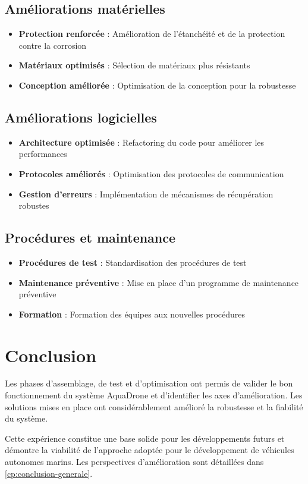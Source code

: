 {\subsection{Améliorations matérielles}
\begin{itemize}
    \item \textbf{Protection renforcée} : Amélioration de l'étanchéité et de la protection contre la corrosion
    \item \textbf{Matériaux optimisés} : Sélection de matériaux plus résistants
    \item \textbf{Conception améliorée} : Optimisation de la conception pour la robustesse
\end{itemize}

\subsection{Améliorations logicielles}
\begin{itemize}
    \item \textbf{Architecture optimisée} : Refactoring du code pour améliorer les performances
    \item \textbf{Protocoles améliorés} : Optimisation des protocoles de communication
    \item \textbf{Gestion d'erreurs} : Implémentation de mécanismes de récupération robustes
\end{itemize}

\subsection{Procédures et maintenance}
\begin{itemize}
    \item \textbf{Procédures de test} : Standardisation des procédures de test
    \item \textbf{Maintenance préventive} : Mise en place d'un programme de maintenance préventive
    \item \textbf{Formation} : Formation des équipes aux nouvelles procédures
\end{itemize}

\section{Conclusion}
Les phases d'assemblage, de test et d'optimisation ont permis de valider le bon fonctionnement du système AquaDrone et d'identifier les axes d'amélioration. Les solutions mises en place ont considérablement amélioré la robustesse et la fiabilité du système.

Cette expérience constitue une base solide pour les développements futurs et démontre la viabilité de l'approche adoptée pour le développement de véhicules autonomes marins. Les perspectives d'amélioration sont détaillées dans \autoref{cp:conclusion-generale}.

} 